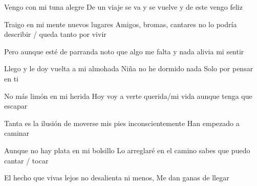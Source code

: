 \endverse



\beginverse
    Vengo con mi tuna alegre
    De un viaje se va y se vuelve
    y de este vengo feliz

    Traigo en mi mente nuevos lugares
    Amigos,  bromas,  cantares
    no lo podría describir / queda tanto por vivir
\endverse

\beginverse
    Pero aunque esté de parranda
    noto que algo me falta
    y nada alivia mi sentir
    
    Llego y le doy vuelta a mi almohada
    Niña no he dormido nada
    Solo por pensar en ti
\endverse

\beginverse
    No más limón en mi herida
    Hoy voy a verte querida/mi vida 
    aunque tenga que escapar
    
    Tanta es la ilusión de moverse
    mis pies inconscientemente
    Han empezado a caminar
\endverse

\beginverse
    Aunque no hay plata en mi bolsillo
    Lo arreglaré en el camino
    sabes que puedo cantar / tocar
    
    El hecho que vivas lejos
    no desalienta ni menos,
    Me dan ganas de llegar
\endverse
